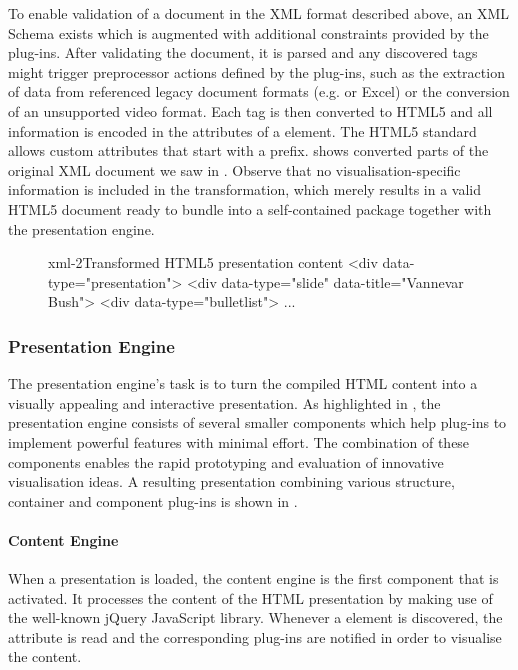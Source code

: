      To enable validation of a \mxp document in the XML format described above,
     an XML Schema exists which is augmented with additional constraints
     provided by the plug-ins. After validating the document, it is parsed and
     any discovered tags might trigger preprocessor actions defined by the
     plug-ins, such as the extraction of data from referenced legacy document
     formats (e.g. \ppt or Excel) or the conversion of an unsupported video
     format. Each tag is then converted to HTML5 and all information is encoded
     in the attributes of a  element. The HTML5 standard allows
     custom attributes that start with a  prefix. 
     shows converted parts of the original XML document we saw in
     . Observe that no visualisation-specific information is
     included in the transformation, which merely results in a valid HTML5
     document ready to bundle into a self-contained package together with the
     presentation engine.

     \begin{figure}[h!]
      \begin{lstxml}{xml-2}{Transformed HTML5 presentation content}
<div data-type="presentation">
  <div data-type="slide" data-title="Vannevar Bush">
    <div data-type="bulletlist">
      ...
      \end{lstxml}
     \end{figure}

    \subsubsection{Presentation Engine}

     The presentation engine's task is to turn the compiled HTML content into a
     visually appealing and interactive presentation. As highlighted in
     , the presentation engine consists of several
     smaller components which help plug-ins to implement powerful features with
     minimal effort. The combination of these components enables the rapid
     prototyping and evaluation of innovative visualisation ideas. A resulting
     \mxp presentation combining various structure, container and component
     plug-ins is shown in .


     \paragraph{Content Engine} When a presentation is loaded, the content
      engine is the first component that is activated. It processes the content
      of the HTML presentation by making use of the well-known jQuery
      JavaScript library. Whenever a  element is discovered, the
       attribute is read and the corresponding plug-ins are
      notified in order to visualise the content.

